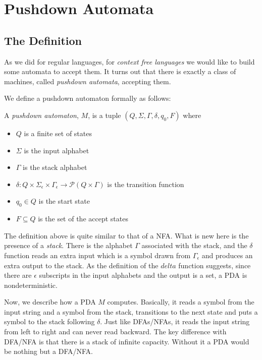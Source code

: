 \documentclass[11pt]{article}
\begin{document}
\section{Pushdown Automata}

\subsection{The Definition}

As we did for regular languages, for \emph{context free languages} we would like to build some
automata to accept them. It turns out that there is exactly a class of machines, called \emph{
pushdown automata}, accepting them.

We define a pushdown automaton formally as follows:

\begin{definition}
A \emph{pushdown automaton}, $M$, is a tuple $(Q,\Sigma,\Gamma,\delta,q_0,F)$ where
\begin{itemize}
\item $Q$ is a finite set of states
\item $\Sigma$ is the input alphabet
\item $\Gamma$ is the stack alphabet
\item
$\delta : Q \times \Sigma_{\epsilon} \times \Gamma_{\epsilon} \rightarrow \mathcal{P}(Q \times \Gamma)$
is the transition function
\item $q_0 \in Q$ is the start state
\item $F \subseteq Q$ is the set of the accept states
\end{itemize}
\end{definition}

The definition above is quite similar to that of a NFA. What is new here is the presence of a
\emph{stack}. There is the alphabet $\Gamma$ associated with the stack, and the $\delta$ function
reads an extra input which is a symbol drawn from $\Gamma_{\epsilon}$ and produces an extra
output to the stack. As the definition of the $delta$ function suggests, since there are
$\epsilon$ subscripts in the input alphabets and the output is a set, a PDA is nondeterministic.

Now, we describe how a PDA $M$ computes. Basically, it reads a symbol from the input string and
a symbol from the stack, transitions to the next state and puts a symbol to the stack following
$\delta$. Just like DFAs/NFAs, it reads the input string from left to right and can never read
backward. The key difference with DFA/NFA is that there is a stack of infinite capacity. Without
it a PDA would be nothing but a DFA/NFA.
\end{document}
